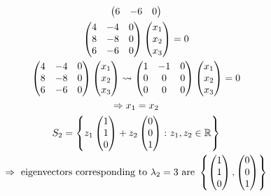 \begin{enumerate}
\begin{itemize}
\begin{gather}
\begin{pmatrix}
6 & -6 & 0
\end{pmatrix}\\
\begin{pmatrix}
4 & -4 & 0\\
8 & -8 & 0\\
6 & -6 & 0
\end{pmatrix}
\begin{pmatrix}
x_1\\x_2\\x_3
\end{pmatrix}=0\\
\begin{pmatrix}
4 & -4 & 0\\
8 & -8 & 0\\
6 & -6 & 0
\end{pmatrix}
\begin{pmatrix}
x_1\\x_2\\x_3
\end{pmatrix}\leadsto
\begin{pmatrix}
1 & -1 & 0\\
0 & 0 & 0\\
0 & 0 & 0
\end{pmatrix}
\begin{pmatrix}
x_1\\x_2\\x_3
\end{pmatrix} = 0\\
\implies x_1 = x_2\\
S_2 =\left\{z_1\begin{pmatrix}1\\1\\0\end{pmatrix} +
  z_2\begin{pmatrix}0\\0\\1\end{pmatrix}\colon z_1,z_2 \in
  \mathbb{R}\right\}\\
\notag \implies \text{ eigenvectors corresponding to } \lambda_2 =3
\text{ are } \left\{\begin{pmatrix}1\\1\\0\end{pmatrix},\begin{pmatrix}0\\0\\1\end{pmatrix}\right\}
\end{gather}
\end{itemize}

\end{enumerate}
